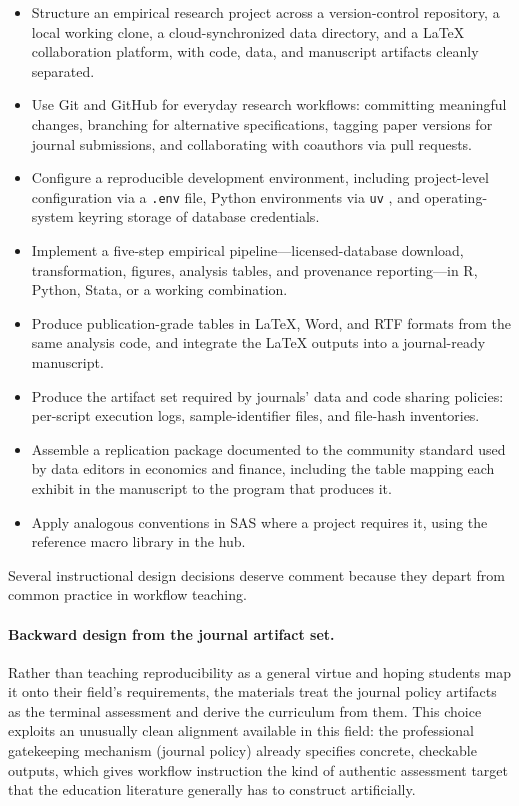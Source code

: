 \documentclass[12pt]{article}
\begin{document}
\begin{itemize}[leftmargin=*]
  \item Structure an empirical research project across a version-control
  repository, a local working clone, a cloud-synchronized data directory,
  and a \LaTeX{} collaboration platform, with code, data, and manuscript
  artifacts cleanly separated.
  \item Use Git and GitHub for everyday research workflows: committing
  meaningful changes, branching for alternative specifications, tagging
  paper versions for journal submissions, and collaborating with
  coauthors via pull requests.
  \item Configure a reproducible development environment, including
  project-level configuration via a \texttt{.env} file, Python
  environments via \texttt{uv} \citep{uv}, and operating-system keyring
  storage of database credentials.
  \item Implement a five-step empirical pipeline---licensed-database
  download, transformation, figures, analysis tables, and provenance
  reporting---in R, Python, Stata, or a working combination.
  \item Produce publication-grade tables in \LaTeX{}, Word, and RTF
  formats from the same analysis code, and integrate the \LaTeX{} outputs
  into a journal-ready manuscript.
  \item Produce the artifact set required by journals' data and code
  sharing policies: per-script execution logs, sample-identifier files,
  and file-hash inventories.
  \item Assemble a replication package documented to the community
  standard used by data editors in economics and finance, including the
  table mapping each exhibit in the manuscript to the program that
  produces it.
  \item Apply analogous conventions in SAS where a project requires it,
  using the reference macro library in the hub.
\end{itemize}

Several instructional design decisions deserve comment because they
depart from common practice in workflow teaching.

\paragraph{Backward design from the journal artifact set.}
Rather than teaching reproducibility as a general virtue and hoping
students map it onto their field's requirements, the materials treat the
journal policy artifacts as the terminal assessment and derive the
curriculum from them. This choice exploits an unusually clean alignment
available in this field: the professional gatekeeping mechanism (journal
policy) already specifies concrete, checkable outputs, which gives
workflow instruction the kind of authentic assessment target that the
education literature generally has to construct artificially.
\end{document}
